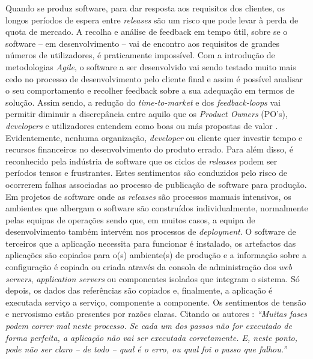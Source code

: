 \hspace{1cm}Quando se produz software, para dar resposta aos requisitos dos clientes, os longos períodos de espera entre \textit{releases} são um risco que pode levar à perda de quota de mercado. A recolha e análise de feedback em tempo útil, sobre se o software -- em desenvolvimento -- vai de encontro aos requisitos de grandes números de utilizadores, é praticamente impossível. Com a introdução de metodologias \textit{Agile}, o software a ser desenvolvido vai sendo testado muito mais cedo no processo de desenvolvimento pelo cliente final e assim é possível analisar o seu comportamento e recolher feedback sobre a sua adequação em termos de solução. Assim sendo, a redução do \textit{time-to-market} e dos \textit{feedback-loops} vai permitir diminuir a discrepância entre aquilo que os \textit{Product Owners} (PO's), \textit{developers} e utilizadores entendem como boas ou más propostas de valor  \cite{raud2016caseStudy}. Evidentemente, nenhuma organização, \textit{developer} ou cliente quer investir tempo e recursos financeiros no desenvolvimento do produto errado. Para além disso, é reconhecido pela indústria de software que os ciclos de \textit{releases} podem ser períodos tensos e frustrantes. Estes sentimentos são conduzidos pelo risco de ocorrerem falhas associadas ao processo de publicação de software para produção. Em projetos de software onde as \textit{releases} são processos manuais intensivos, os ambientes que albergam o software são construídos individualmente, normalmente pelas equipas de operações sendo que, em muitos casos, a equipa de desenvolvimento também intervém nos processos de \textit{deployment}. O software de terceiros que a aplicação necessita para funcionar é instalado, os artefactos das aplicações são copiados para o(s) ambiente(s) de produção e a informação sobre a configuração é copiada ou criada através da consola de administração dos \textit{web servers}, \textit{application servers} ou componentes isolados que integram o sistema. Só depois, os dados das referências são copiados e, finalmente, a aplicação é executada serviço a serviço, componente a componente. Os sentimentos de tensão e nervosismo estão presentes por razões claras. Citando os autores : \textit{``Muitas fases podem correr mal neste processo. Se cada um dos passos não for executado de forma perfeita, a aplicação não vai ser executada corretamente. E, neste ponto, pode não ser claro -- de todo -- qual é o erro, ou qual foi o passo que falhou.''}

